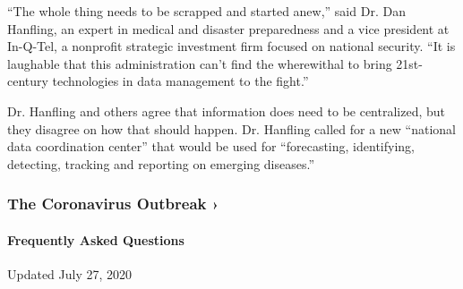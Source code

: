 ``The whole thing needs to be scrapped and started anew,'' said Dr. Dan
Hanfling, an expert in medical and disaster preparedness and a vice
president at In-Q-Tel, a nonprofit strategic investment firm focused on
national security. ``It is laughable that this administration can't find
the wherewithal to bring 21st-century technologies in data management to
the fight.''

Dr. Hanfling and others agree that information does need to be
centralized, but they disagree on how that should happen. Dr. Hanfling
called for a new ``national data coordination center'' that would be
used for ``forecasting, identifying, detecting, tracking and reporting
on emerging diseases.''

\href{https://www.nytimes.com/news-event/coronavirus?action=click\&pgtype=Article\&state=default\&region=MAIN_CONTENT_3\&context=storylines_faq}{}

\hypertarget{the-coronavirus-outbreak-}{%
\subsubsection{The Coronavirus Outbreak
›}\label{the-coronavirus-outbreak-}}

\hypertarget{frequently-asked-questions}{%
\paragraph{Frequently Asked
Questions}\label{frequently-asked-questions}}

Updated July 27, 2020

